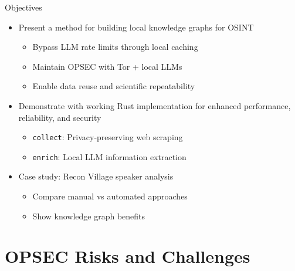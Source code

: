 \documentclass[pdf,aspectratio=169]{beamer}
\begin{document}
%
%
%
\begin{frame}{Objectives}
  \begin{itemize}
  \item Present a method for building local knowledge graphs for OSINT
    \begin{itemize}
    \item Bypass LLM rate limits through local caching
    \item Maintain OPSEC with Tor + local LLMs
    \item Enable data reuse and scientific repeatability
    \end{itemize}
  \item Demonstrate with working Rust implementation for enhanced performance, reliability, and security
    \begin{itemize}
    \item \texttt{collect}: Privacy-preserving web scraping
    \item \texttt{enrich}: Local LLM information extraction
    \end{itemize}
  \item Case study: Recon Village speaker analysis
    \begin{itemize}
    \item Compare manual vs automated approaches
    \item Show knowledge graph benefits
    \end{itemize}
  \end{itemize}
\end{frame}

\section{OPSEC Risks and Challenges}
\end{document}
